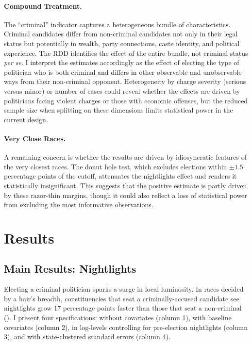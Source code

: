 \documentclass[12pt]{article}
\begin{document}
\paragraph{Compound Treatment.} The ``criminal'' indicator captures a heterogeneous bundle of characteristics. Criminal candidates differ from non-criminal candidates not only in their legal status but potentially in wealth, party connections, caste identity, and political experience. The RDD identifies the effect of the entire bundle, not criminal status \textit{per se}. I interpret the estimates accordingly as the effect of electing the type of politician who is both criminal and differs in other observable and unobservable ways from their non-criminal opponent. Heterogeneity by charge severity (serious versus minor) or number of cases could reveal whether the effects are driven by politicians facing violent charges or those with economic offenses, but the reduced sample size when splitting on these dimensions limits statistical power in the current design.

\paragraph{Very Close Races.} A remaining concern is whether the results are driven by idiosyncratic features of the very closest races. The donut hole test, which excludes elections within $\pm 1.5$ percentage points of the cutoff, attenuates the nightlights effect and renders it statistically insignificant. This suggests that the positive estimate is partly driven by these razor-thin margins, though it could also reflect a loss of statistical power from excluding the most informative observations.


\section{Results}

\subsection{Main Results: Nightlights}

Electing a criminal politician sparks a surge in local luminosity. In races decided by a hair's breadth, constituencies that seat a criminally-accused candidate see nightlights grow 17 percentage points faster than those that seat a non-criminal (). I present four specifications: without covariates (column 1), with baseline covariates (column 2), in log-levels controlling for pre-election nightlights (column 3), and with state-clustered standard errors (column 4).
\end{document}
